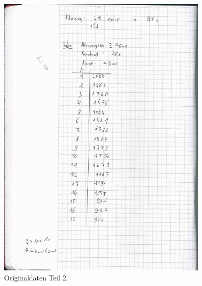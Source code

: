 \begin{figure}[H]
  \centering
  \includegraphics[page=2, height=14cm]{messdaten/scan.pdf}
  \caption{Originaldaten Teil 2.}
  \label{fig:original2}
\end{figure}
